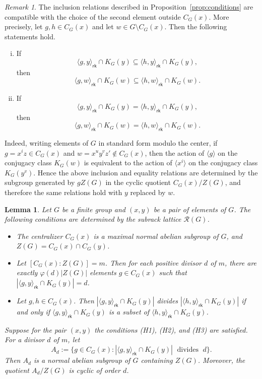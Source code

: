 \documentclass[a4paper,12pt]{article}
\newtheorem{lem}[thm]{Lemma}
\theoremstyle{definition}
\theoremstyle{remark}
\newtheorem*{rem}{Remark}
\begin{document}
\begin{rem}\label{rem:compatible}
  The inclusion relations described in Proposition~\ref{prop:conditions} are compatible with the choice of the second element outside $C_G(x)$. More precisely, let $g,h\in C_G(x)$ and let $w\in G\setminus C_G(x)$. Then the following statements hold.
  \begin{enumerate}[(i)]
  \item If
  $$ \langle g,y\rangle_{\mathsf{rk}}\cap K_G(y)\subseteq \langle h,y\rangle_{\mathsf{rk}}\cap K_G(y), $$
  then
  $$ \langle g,w\rangle_{\mathsf{rk}}\cap K_G(w)\subseteq \langle h,w\rangle_{\mathsf{rk}}\cap K_G(w). $$
  \item If
  $$ \langle g,y\rangle_{\mathsf{rk}}\cap K_G(y) = \langle h,y\rangle_{\mathsf{rk}}\cap K_G(y), $$
  then
  $$ \langle g,w\rangle_{\mathsf{rk}}\cap K_G(w) = \langle h,w\rangle_{\mathsf{rk}}\cap K_G(w). $$
  \end{enumerate}

  Indeed, writing elements of $G$ in standard form modulo the center, if $g=x^iz\in C_G(x)$ and $w=x^uy^vz'\notin C_G(x)$, then the action of $\langle g\rangle$ on the conjugacy class $K_G(w)$ is equivalent to the action of $\langle x^i\rangle$ on the conjugacy class $K_G(y^v)$. Hence the above inclusion and equality relations are determined by the subgroup generated by $gZ(G)$ in the cyclic quotient $C_G(x)/Z(G)$, and therefore the same relations hold with $y$ replaced by $w$.
\end{rem}


\begin{lem}\label{lem:group}
  Let $G$ be a finite group and $(x,y)$ be a pair of elements of $G$. The following conditions are determined by the subrack lattice $\mathcal{R}(G)$.
  \begin{itemize}
  \item[{\rm (H1)}] The centralizer $C_G(x)$ is a maximal normal abelian subgroup of $G$, and $Z(G)=C_G(x)\cap C_G(y)$.
  \item[{\rm (H2)}] Let $[C_G(x):Z(G)]=m$. Then for each positive divisor $d$ of $m$, there are exactly $\varphi(d)|Z(G)|$ elements $g\in C_G(x)$ such that $|\langle g,y\rangle_{\mathsf{rk}}\cap K_G(y)|=d$.
  \item[{\rm (H3)}] Let $g,h\in C_G(x)$. Then $|\langle g,y\rangle_{\mathsf{rk}}\cap K_G(y)|$ divides $|\langle h,y\rangle_{\mathsf{rk}}\cap K_G(y)|$ if and only if $\langle g,y\rangle_{\mathsf{rk}}\cap K_G(y)$ is a subset of $\langle h,y\rangle_{\mathsf{rk}}\cap K_G(y)$.
  \end{itemize}
  Suppose for the pair $(x,y)$ the conditions {\rm (H1)}, {\rm (H2)}, and {\rm (H3)} are satisfied. For a divisor $d$ of $m$, let
  $$ A_d := \{g\in C_G(x)\colon |\langle g,y\rangle_{\mathsf{rk}}\cap K_G(y)|\; \text{ divides }\; d\}. $$
  Then $A_d$ is a normal abelian subgroup of $G$ containing $Z(G)$. Moreover, the quotient $A_d/Z(G)$ is cyclic of order $d$.     
\end{lem}
\end{document}
